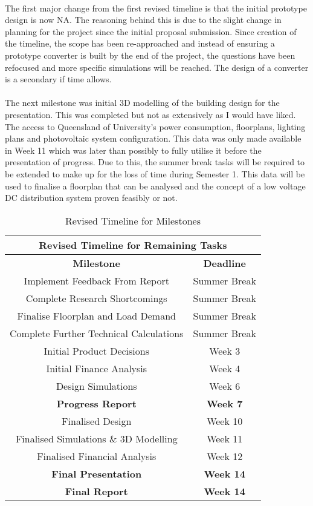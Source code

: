 \paragraph{}
The first major change from the first revised timeline is that the initial prototype design is now NA. The reasoning behind this is due to the slight change in planning for the project since the initial proposal submission. Since creation of the timeline, the scope has been re-approached and instead of ensuring a prototype converter is built by the end of the project, the questions have been refocused and more specific simulations will be reached. The design of a converter is a secondary if time allows. 

\paragraph{}
The next milestone was initial 3D modelling of the building design for the presentation. This was completed but not as extensively as I would have liked. The access to Queensland of University's power consumption, floorplans, lighting plans and photovoltaic system configuration. This data was only made available in Week 11 which was later than possibly to fully utilise it before the presentation of progress. Due to this, the summer break tasks will be required to be extended to make up for the loss of time during Semester 1. This data will be used to finalise a floorplan that can be analysed and the concept of a low voltage DC distribution system proven feasibly or not.  

\begin{table}[H]
\centering
\begin{tabular}{||c c||} 
 \hline
 \multicolumn{2}{|c|}{\textbf{Revised Timeline for Remaining Tasks}} \\ \hline\hline
 \textbf{Milestone} & \textbf{Deadline}\\ [0.5ex] 
 \hline\hline
 Implement Feedback From Report & Summer Break  \\
 Complete Research Shortcomings & Summer Break  \\
 Finalise Floorplan and Load Demand & Summer Break  \\
 Complete Further Technical Calculations & Summer Break  \\
 Initial Product Decisions & Week 3  \\
 Initial Finance Analysis & Week 4  \\
 Design Simulations & Week 6  \\ 
 \textbf{Progress Report} & \textbf{Week 7}  \\
 Finalised Design & Week 10  \\
 Finalised Simulations \& 3D Modelling & Week 11  \\
 Finalised Financial Analysis & Week 12  \\ 
 \textbf{Final Presentation} & \textbf{Week 14} \\
 \textbf{Final Report} & \textbf{Week 14} \\ [1ex] 
 \hline
\end{tabular}
\caption{Revised Timeline for Milestones}
\label{table:milestones_3}
\end{table} 
